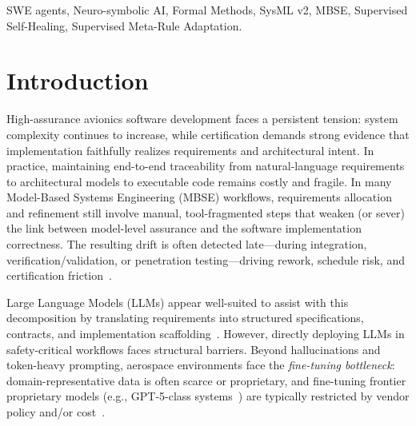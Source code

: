 \documentclass[conference]{IEEEtran}
\begin{document}
\begin{IEEEkeywords}
SWE agents, Neuro-symbolic AI, Formal Methods, SysML v2, MBSE, Supervised Self-Healing, Supervised Meta-Rule Adaptation.
\end{IEEEkeywords}


\section{Introduction}

High-assurance avionics software development faces a persistent tension: system complexity continues to increase, while certification demands strong evidence that implementation faithfully realizes requirements and architectural intent. In practice, maintaining end-to-end traceability from natural-language requirements to architectural models to executable code remains costly and fragile. In many Model-Based Systems Engineering (MBSE) workflows, requirements allocation and refinement still involve manual, tool-fragmented steps that weaken (or sever) the link between model-level assurance and the software implementation correctness. The resulting drift is often detected late---during integration, verification/validation, or penetration testing---driving rework, schedule risk, and certification friction~\cite{hardin2025dasc}.

Large Language Models (LLMs) appear well-suited to assist with this decomposition by translating requirements into structured specifications, contracts, and implementation scaffolding~\cite{openai-gpt5-2-codex}. However, directly deploying LLMs in safety-critical workflows faces structural barriers. Beyond hallucinations and token-heavy prompting, aerospace environments face the \emph{fine-tuning bottleneck}: domain-representative data is often scarce or proprietary, and fine-tuning frontier proprietary models (e.g., GPT-5-class systems~\cite{bubeck2025earlyscienceaccelerationexperiments}) are typically restricted by vendor policy and/or cost~\cite{gpt5-system-card,openai-gpt5-2-codex}.
\end{document}
